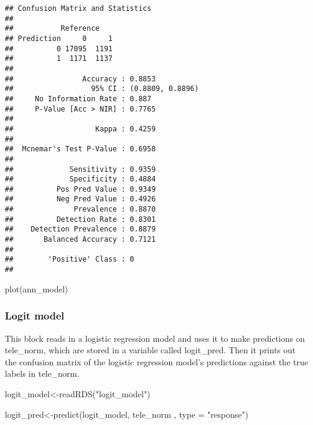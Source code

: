 \documentclass[
]{article}
\newenvironment{Shaded}{\begin{snugshade}}{\end{snugshade}}
\newcommand{\AttributeTok}[1]{\textcolor[rgb]{0.77,0.63,0.00}{#1}}
\newcommand{\FunctionTok}[1]{\textcolor[rgb]{0.00,0.00,0.00}{#1}}
\newcommand{\NormalTok}[1]{#1}
\newcommand{\OtherTok}[1]{\textcolor[rgb]{0.56,0.35,0.01}{#1}}
\newcommand{\StringTok}[1]{\textcolor[rgb]{0.31,0.60,0.02}{#1}}
\begin{document}
\begin{verbatim}
## Confusion Matrix and Statistics
## 
##           Reference
## Prediction     0     1
##          0 17095  1191
##          1  1171  1137
##                                           
##                Accuracy : 0.8853          
##                  95% CI : (0.8809, 0.8896)
##     No Information Rate : 0.887           
##     P-Value [Acc > NIR] : 0.7765          
##                                           
##                   Kappa : 0.4259          
##                                           
##  Mcnemar's Test P-Value : 0.6958          
##                                           
##             Sensitivity : 0.9359          
##             Specificity : 0.4884          
##          Pos Pred Value : 0.9349          
##          Neg Pred Value : 0.4926          
##              Prevalence : 0.8870          
##          Detection Rate : 0.8301          
##    Detection Prevalence : 0.8879          
##       Balanced Accuracy : 0.7121          
##                                           
##        'Positive' Class : 0               
## 
\end{verbatim}

\begin{Shaded}
\begin{Highlighting}[]
\FunctionTok{plot}\NormalTok{(ann\_model)}
\end{Highlighting}
\end{Shaded}

\hypertarget{logit-model}{%
\subsubsection{Logit model}\label{logit-model}}

This block reads in a logistic regression model and uses it to make
predictions on tele\_norm, which are stored in a variable called
logit\_pred. Then it prints out the confusion matrix of the logistic
regression model's predictions against the true labels in tele\_norm.

\begin{Shaded}
\begin{Highlighting}[]
\NormalTok{logit\_model}\OtherTok{\textless{}{-}}\FunctionTok{readRDS}\NormalTok{(}\StringTok{"logit\_model"}\NormalTok{)}

\NormalTok{logit\_pred}\OtherTok{\textless{}{-}}\FunctionTok{predict}\NormalTok{(logit\_model, tele\_norm , }\AttributeTok{type =} \StringTok{"response"}\NormalTok{)}
\end{Highlighting}
\end{Shaded}
\end{document}

